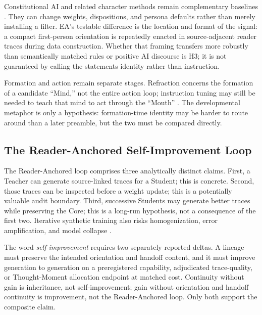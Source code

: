 \documentclass[11pt]{article}
\begin{document}
			Constitutional AI and related character methods remain complementary baselines \cite{bai2022constitutional}. They can change weights, dispositions, and persona defaults rather than merely installing a filter. EA's testable difference is the location and format of the signal: a compact first-person orientation is repeatedly enacted in source-adjacent reader traces during data construction. Whether that framing transfers more robustly than semantically matched rules or positive AI discourse is H3; it is not guaranteed by calling the statements identity rather than instruction.

			Formation and action remain separate stages. Refraction concerns the
			formation of a candidate ``Mind,'' not the entire action loop; instruction
			tuning may still be needed to teach that mind to act through the ``Mouth''
			\cite{wei2021finetuned}. The developmental metaphor is only a hypothesis:
			formation-time identity may be harder to route around than a later preamble,
			but the two must be compared directly.

	\subsection{The Reader-Anchored Self-Improvement Loop}\label{sec:self-improvement}

		The Reader-Anchored loop comprises three analytically distinct claims. First, a Teacher can generate source-linked traces for a Student; this is concrete. Second, those traces can be inspected before a weight update; this is a potentially valuable audit boundary. Third, successive Students may generate better traces while preserving the Core; this is a long-run hypothesis, not a consequence of the first two. Iterative synthetic training also risks homogenization, error amplification, and model collapse \cite{zelikman2022star,shumailov2023curse}.

		The word \emph{self-improvement} requires two separately reported deltas.
		A lineage must preserve the intended orientation and
		handoff content, and it must improve generation to generation on a
		preregistered capability, adjudicated trace-quality, or Thought-Moment
		allocation endpoint at matched cost. Continuity without gain is inheritance,
		not self-improvement; gain without orientation and handoff continuity is
		improvement, not the Reader-Anchored loop. Only both support the composite
		claim.
\end{document}
